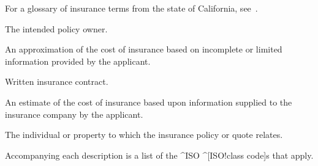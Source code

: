 %
%


For a glossary of insurance terms from the state of California,
see~\cite{gls-ins-calif}.

\begin{description}
  The intended policy owner.

  An approximation of the cost of insurance based on incomplete or limited
  information provided by the applicant.

  Written insurance contract.

  An estimate of the cost of insurance based upon information supplied to the
  insurance company by the applicant.

  The individual or property to which the insurance policy or quote relates.
\end{description}


Accompanying each description is a list of the ^ISO ^[ISO!class code]s that
apply.

